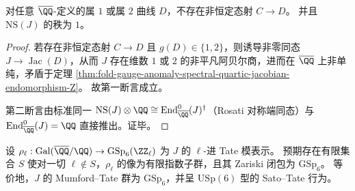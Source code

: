 \begin{corollary}\label{cor:fold-gauge-anomaly-spectral-quartic-no-low-genus-maps-ns-rank1}
对任意 \(\overline{\QQ}\)-定义的属 \(1\) 或属 \(2\) 曲线 \(D\)，不存在非恒定态射 \(C\to D\)。
并且 \(\mathrm{NS}(J)\) 的秩为 \(1\)。
\end{corollary}
\begin{proof}
若存在非恒定态射 \(C\to D\) 且 \(g(D)\in\{1,2\}\)，则诱导非零同态 \(J\to \operatorname{Jac}(D)\)，从而 \(J\) 存在维数 \(1\) 或 \(2\) 的非平凡阿贝尔商，进而在 \(\overline{\QQ}\) 上非单纯，矛盾于定理 \ref{thm:fold-gauge-anomaly-spectral-quartic-jacobian-endomorphism-Z}。
故第一断言成立。
\par
第二断言由标准同一 \(\mathrm{NS}(J)\otimes\QQ\cong \operatorname{End}^0_{\overline{\QQ}}(J)^{\dagger}\)（Rosati 对称端同态）与
\(\operatorname{End}^0_{\overline{\QQ}}(J)=\QQ\) 直接推出。证毕。
\end{proof}

\begin{conjecture}\label{conj:fold-gauge-anomaly-spectral-quartic-mumford-tate-gsp6}
设 \(\rho_{\ell}:\mathrm{Gal}(\overline{\QQ}/\QQ)\to \mathrm{GSp}_{6}(\ZZ_\ell)\) 为 \(J\) 的 \(\ell\)-进 Tate 模表示。
预期存在有限集合 \(S\) 使对一切 \(\ell\notin S\)，\(\rho_\ell\) 的像为有限指数子群，且其 Zariski 闭包为 \(\mathrm{GSp}_{6}\)。
等价地，\(J\) 的 Mumford--Tate 群为 \(\mathrm{GSp}_6\)，并呈 \(\mathrm{USp}(6)\) 型的 Sato--Tate 行为。
\end{conjecture}

\endinput
